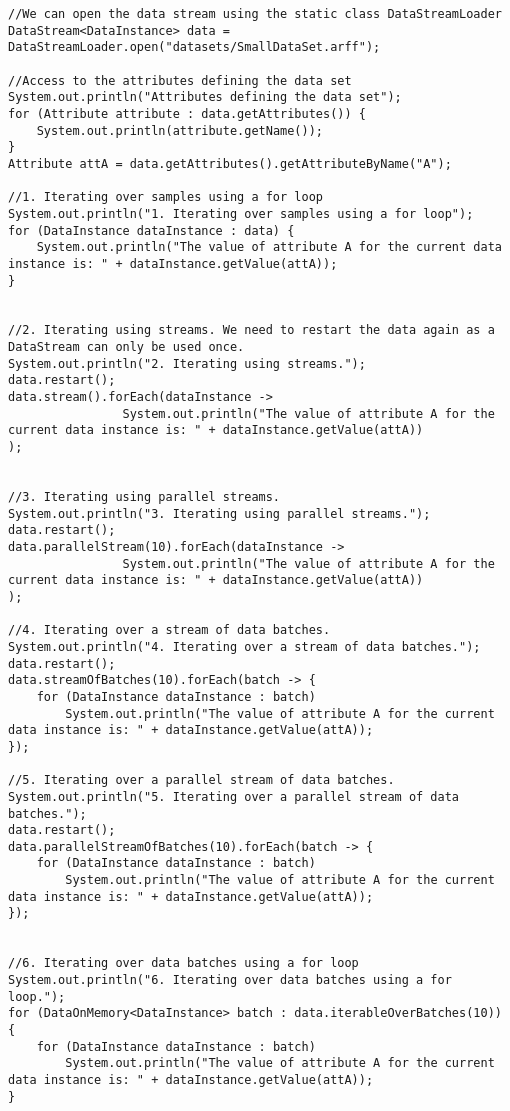 \begin{lstlisting}
//We can open the data stream using the static class DataStreamLoader
DataStream<DataInstance> data = DataStreamLoader.open("datasets/SmallDataSet.arff");

//Access to the attributes defining the data set
System.out.println("Attributes defining the data set");
for (Attribute attribute : data.getAttributes()) {
    System.out.println(attribute.getName());
}
Attribute attA = data.getAttributes().getAttributeByName("A");

//1. Iterating over samples using a for loop
System.out.println("1. Iterating over samples using a for loop");
for (DataInstance dataInstance : data) {
    System.out.println("The value of attribute A for the current data instance is: " + dataInstance.getValue(attA));
}


//2. Iterating using streams. We need to restart the data again as a DataStream can only be used once.
System.out.println("2. Iterating using streams.");
data.restart();
data.stream().forEach(dataInstance ->
                System.out.println("The value of attribute A for the current data instance is: " + dataInstance.getValue(attA))
);


//3. Iterating using parallel streams.
System.out.println("3. Iterating using parallel streams.");
data.restart();
data.parallelStream(10).forEach(dataInstance ->
                System.out.println("The value of attribute A for the current data instance is: " + dataInstance.getValue(attA))
);

//4. Iterating over a stream of data batches.
System.out.println("4. Iterating over a stream of data batches.");
data.restart();
data.streamOfBatches(10).forEach(batch -> {
    for (DataInstance dataInstance : batch)
        System.out.println("The value of attribute A for the current data instance is: " + dataInstance.getValue(attA));
});

//5. Iterating over a parallel stream of data batches.
System.out.println("5. Iterating over a parallel stream of data batches.");
data.restart();
data.parallelStreamOfBatches(10).forEach(batch -> {
    for (DataInstance dataInstance : batch)
        System.out.println("The value of attribute A for the current data instance is: " + dataInstance.getValue(attA));
});


//6. Iterating over data batches using a for loop
System.out.println("6. Iterating over data batches using a for loop.");
for (DataOnMemory<DataInstance> batch : data.iterableOverBatches(10)) {
    for (DataInstance dataInstance : batch)
        System.out.println("The value of attribute A for the current data instance is: " + dataInstance.getValue(attA));
}

\end{lstlisting}


